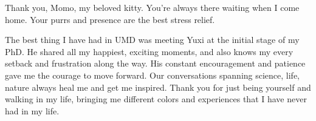 Thank you, Momo, my beloved kitty. 
You’re always there waiting when I come home. 
Your purrs and presence are the best stress relief.

The best thing I have had in UMD was meeting Yuxi at the initial stage of my PhD. 
He shared all my happiest, exciting moments, and also knows my every setback and frustration along the way. 
His constant encouragement and patience gave me the courage to move forward.
Our conversations spanning science, life, nature always heal me and get me inspired.
Thank you for just being yourself and walking in my life, bringing me different colors and experiences that I have never had in my life. 

\vspace{1ex}



